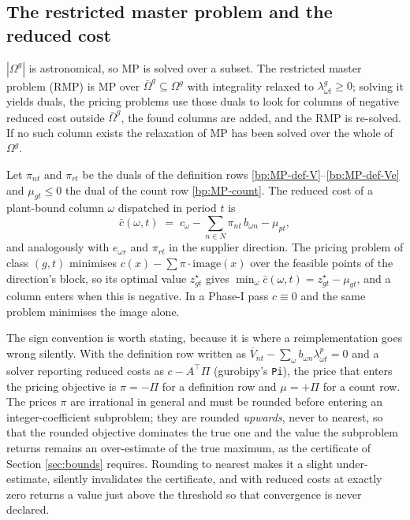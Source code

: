 \subsection{The restricted master problem and the reduced cost}
\label{sec:rmp}

$|\Omega^{g}|$ is astronomical, so MP is solved over a subset. The
restricted master problem (RMP) is MP over
$\bar\Omega^{g}\subseteq\Omega^{g}$ with integrality relaxed to
$\lambda^{g}_{\omega t}\ge0$; solving it yields duals, the pricing
problems use those duals to look for columns of negative reduced cost
outside $\bar\Omega^{g}$, the found columns are added, and the RMP is
re-solved. If no such column exists the relaxation of MP has been
solved over the whole of $\Omega^{g}$.

Let $\pi_{nt}$ and $\pi_{rt}$ be the duals of the definition rows
\eqref{bp:MP-def-V}--\eqref{bp:MP-def-Ve} and $\mu_{gt}\le0$ the dual
of the count row \eqref{bp:MP-count}. The reduced cost of a
plant-bound column $\omega$ dispatched in period $t$ is
\begin{equation}
\bar c(\omega,t)\;=\;c_{\omega}-\sum_{n\in N}\pi_{nt}\,b_{\omega n}
                              -\mu_{pt},
\label{eq:redcost}
\end{equation}
and analogously with $e_{\omega r}$ and $\pi_{rt}$ in the supplier
direction. The pricing problem of class $(g,t)$ minimises
$c(x)-\sum\pi\cdot\mathrm{image}(x)$ over the feasible points of the
direction's block, so its optimal value $z^{\star}_{gt}$ gives
$\min_{\omega}\bar c(\omega,t)=z^{\star}_{gt}-\mu_{gt}$, and a column
enters when this is negative. In a Phase-I pass $c\equiv0$ and the same
problem minimises the image alone.

The sign convention is worth stating, because it is where a
reimplementation goes wrong silently. With the definition row written
as $\overline{V}_{nt}-\sum_{\omega}b_{\omega n}\lambda^{p}_{\omega t}=0$
and a solver reporting reduced costs as $c-A^{\top}\Pi$ (gurobipy's
\texttt{Pi}), the price that enters the pricing objective is
$\pi=-\Pi$ for a definition row and $\mu=+\Pi$ for a count row. The
prices $\pi$ are irrational in general and must be rounded before
entering an integer-coefficient subproblem; they are rounded
\emph{upwards}, never to nearest, so that the rounded objective
dominates the true one and the value the subproblem returns remains an
over-estimate of the true maximum, as the certificate of Section
\ref{sec:bounds} requires. Rounding to nearest makes it a slight
under-estimate, silently invalidates the certificate, and with reduced
costs at exactly zero returns a value just above the threshold so that
convergence is never declared.

